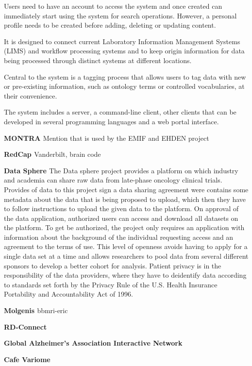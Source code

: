 Users need to have an account to access the system and once created can immediately
start using the system for search operations. However, a personal profile needs to be
created before adding, deleting or updating content.

It is designed to connect current Laboratory Information Management Systems (LIMS) and
workflow processing systems and to keep origin information for data being processed
through distinct systems at different locations.

Central to the system is a tagging process that allows users to tag data with new or
pre-existing information, such as ontology terms or controlled vocabularies, at their
convenience.

The system includes a server, a command-line client, other clients that can be
developed in several programming languages and a web portal interface.


\textbf{MONTRA \cite{montra}}
Mention that is used by the EMIF and EHDEN project

\textbf{RedCap \cite{redcap}}
Vanderbilt, brain code

\textbf{Data Sphere \cite{datasphere}}
The Data sphere project provides a platform on which industry and academia can share
raw data from late-phase oncology clinical trials.
Provides of data to this project sign a data sharing agreement were contains some
metadata about the data that is being proposed to upload, which then they have to
follow instructions to upload the given data to the platform.
On approval of the data application, authorized users can access and download all
datasets on the platform.
To get be authorized, the project only requires an application with information about
the background of the individual requesting access and an agreement to the terms of
use.
This level of openness avoids having to apply for a single data set at a time and
allows researchers to pool data from several different sponsors to develop a better
cohort for analysis.
Patient privacy is in the responsibility of the data providers, where they have to
deidentify data according to standards set forth by the Privacy Rule of the U.S. Health
Insurance Portability and Accountability Act of 1996.

\textbf{Molgenis \cite{molgenis}}
bbmri-eric

\textbf{RD-Connect \cite{rdconnect}}

\textbf{Global Alzheimer's Association Interactive Network \cite{gaain}}

\textbf{Cafe Variome \cite{cafevariome}}

